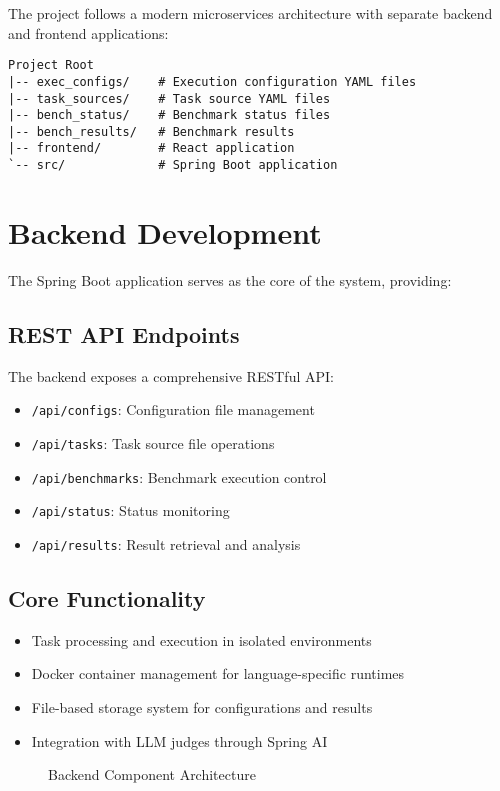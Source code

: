 The project follows a modern microservices architecture with separate backend and frontend applications:

\begin{verbatim}
Project Root
|-- exec_configs/    # Execution configuration YAML files
|-- task_sources/    # Task source YAML files
|-- bench_status/    # Benchmark status files
|-- bench_results/   # Benchmark results
|-- frontend/        # React application
`-- src/             # Spring Boot application
\end{verbatim}

\section{Backend Development}

The Spring Boot application serves as the core of the system, providing:

\subsection{REST API Endpoints}
The backend exposes a comprehensive RESTful API:
\begin{itemize}
    \item \texttt{/api/configs}: Configuration file management
    \item \texttt{/api/tasks}: Task source file operations
    \item \texttt{/api/benchmarks}: Benchmark execution control
    \item \texttt{/api/status}: Status monitoring
    \item \texttt{/api/results}: Result retrieval and analysis
\end{itemize}

\subsection{Core Functionality}
\begin{itemize}
    \item Task processing and execution in isolated environments
    \item Docker container management for language-specific runtimes
    \item File-based storage system for configurations and results
    \item Integration with LLM judges through Spring AI
\end{itemize}

\begin{figure}[h]
    \centering
    \caption{Backend Component Architecture}
    \label{fig:backend-arch}
\end{figure}

